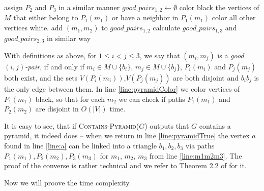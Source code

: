 \begin{algorithmic}[1]
				\ls assign $P_2$ and $P_3$ in a similar manner \label{line:ShortestPathsEnd}
				\ls $good\_pairs_{1,2} \gets \emptyset$ 
				 
						\ls color black the vertices of $M$ that either belong to \label{line:pyramidColor}
						\lsx $P_1(m_1)$ or have a neighbor in $P_1(m_1)$
						\lsx color all other vertices white.
							 \label{line:pyramidColor2}
								\ls add $(m_1, m_2)$ to $good\_pairs_{1,2}$
							\mEndIf
						\mEndFor
					\mEndIf
				\mEndFor
				\ls calculate $good\_pairs_{1,3}$ and $good\_pairs_{2,3}$ in similar way
				 \label{line:m1m2m3}
						\ls \RETURN \TRUE \label{line:pyramidTrue}
					\mEndIf
				\mEndFor
			\mEndIf \label{line:pyramidEnd}
		\mEndFor
	\mEndFor
	\ls \RETURN \FALSE
	\mEndProcedure
\end{algorithmic}

With definitions as above, for $1 \leq i < j \leq 3$, we say that $(m_i, m_j)$ is a \emph{good $(i, j)$-pair}, if and only if $m_i \in M \cup \{b_i\}$, $m_j \in M \cup \{b_j\}$, $P_i(m_i)$ and $P_j(m_j)$ both exist, and the sets $V(P_i(m_i))$,$V(P_j(m_j))$ are both disjoint and $b_ib_j$ is the only edge between them. In line \ref{line:pyramidColor} we color vertices of $P_1(m_1)$ black, so that for each $m_2$ we can check if paths $P_1(m_1)$ and $P_2(m_2)$ are disjoint in $O(|V|)$ time.

It is easy to see, that if \textsc{Contains-Pyramid($G$)} outputs that $G$ contains a pyramid, it indeed does -- when we return in line \ref{line:pyramidTrue} the vertex $a$ found in line \ref{line:a} can be linked into a triangle $b_1, b_2, b_3$ via paths $P_1(m_1), P_2(m_2), P_3(m_3)$ for $m_1$, $m_2$, $m_3$ from line \ref{line:m1m2m3}. The proof of the converse is rather technical and we refer to Theorem 2.2 of \cite{MC05} for it.

Now we will proove the time complexity.

